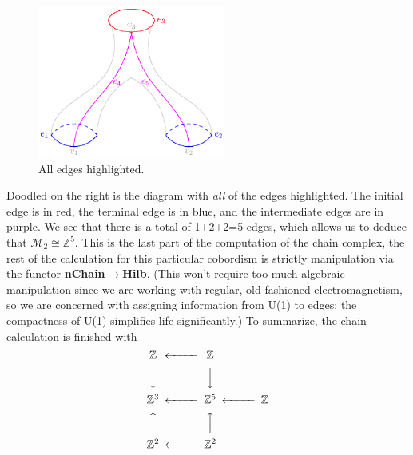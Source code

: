 \documentclass{amsart}
\numberwithin{equation}{section}
\begin{document}
\begin{figure}
  \begin{center}
    \includegraphics[width=0.55\textwidth]{img/img3.eps}
  \end{center}
  \caption{All edges highlighted.}
\end{figure}
Doodled on the right is the diagram with \emph{all} of the edges
highlighted. The initial edge is in red, the terminal edge is in
blue, and the intermediate edges are in purple. We see that there
is a total of 1+2+2=5 edges, which allows us to deduce that
$\mathcal{M}_{2}\cong\mathbb{Z}^{5}$. This is the last part of
the computation of the chain complex, the rest of the calculation
for this particular cobordism is strictly manipulation via the
functor \textbf{nChain}$\to$\textbf{Hilb}. (This won't require
too much algebraic manipulation since we are working with
regular, old fashioned electromagnetism, so we are concerned with
assigning information from U(1) to edges; the compactness of U(1)
simplifies life significantly.) To summarize, the chain
calculation is finished with
\begin{equation}\begin{CD}
\mathbb{Z}     @<<< \mathbb{Z} \\
@VVV                 @VVV\\
\mathbb{Z}^{3} @<<< \mathbb{Z}^{5} @<<< \mathbb{Z} \\
@AAA                 @AAA\\
\mathbb{Z}^{2}  @<<< \mathbb{Z}^{2}
\end{CD}\end{equation}
\end{document}
